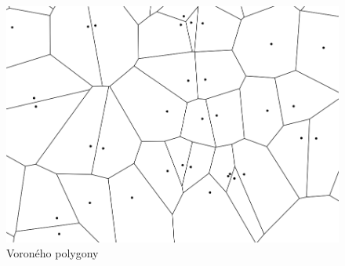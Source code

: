 \begin{figure}[H] \centering
    \includegraphics[width=400pt]{./pictures/voronoi.png}
    \caption[Voroného polygony]{Voroného polygony}
	\label{fig:voronoi}              
\end{figure}   